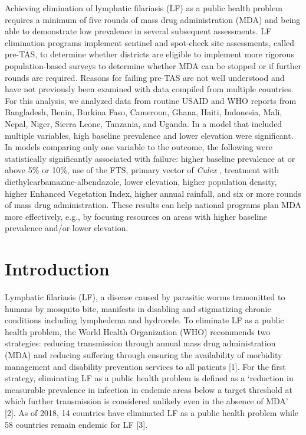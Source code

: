 \documentclass[11pt,a4paper]{article}
\begin{document}
Achieving elimination of lymphatic filariasis (LF) as a public health problem requires a minimum of five rounds of mass drug administration (MDA) and being able to demonstrate low prevalence in several subsequent assessments. LF elimination programs implement sentinel and spot-check site assessments, called pre-TAS, to determine whether districts are eligible to implement more rigorous population-based surveys to determine whether MDA can be stopped or if further rounds are required. Reasons for failing pre-TAS are not well understood and have not previously been examined with data compiled from multiple countries. For this analysis, we analyzed data from routine USAID and WHO reports from Bangladesh, Benin, Burkina Faso, Cameroon, Ghana, Haiti, Indonesia, Mali, Nepal, Niger, Sierra Leone, Tanzania, and Uganda. In a model that included multiple variables, high baseline prevalence and lower elevation were significant. In models comparing only one variable to the outcome, the following were statistically significantly associated with failure: higher baseline prevalence at or above 5\% or 10\%, use of the FTS, primary vector of \textit{Culex} , treatment with diethylcarbamazine-albendazole, lower elevation, higher population density, higher Enhanced Vegetation Index, higher annual rainfall, and six or more rounds of mass drug administration. These results can help national programs plan MDA more effectively, e.g., by focusing resources on areas with higher baseline prevalence and/or lower elevation.

\section{Introduction}

Lymphatic filariasis (LF), a disease caused by parasitic worms transmitted to humans by mosquito bite, manifests in disabling and stigmatizing chronic conditions including lymphedema and hydrocele. To eliminate LF as a public health problem, the World Health Organization (WHO) recommends two strategies: reducing transmission through annual mass drug administration (MDA) and reducing suffering through ensuring the availability of morbidity management and disability prevention services to all patients [1]. For the first strategy, eliminating LF as a public health problem is defined as a ‘reduction in measurable prevalence in infection in endemic areas below a target threshold at which further transmission is considered unlikely even in the absence of MDA’ [2]. As of 2018, 14 countries have eliminated LF as a public health problem while 58 countries remain endemic for LF [3].
\end{document}
